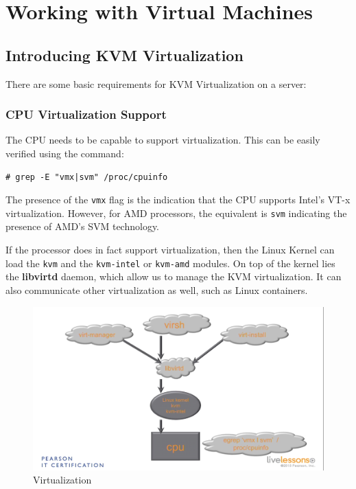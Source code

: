 \chapter{Working with Virtual Machines}

	\section{Introducing KVM Virtualization}
There are some basic requirements for KVM Virtualization on a server: 

\subsection{CPU Virtualization Support}
The CPU needs to be capable to support virtualization. This can be easily verified using the command:

\vspace{-15pt}
\begin{verbatim}
# grep -E "vmx|svm" /proc/cpuinfo
\end{verbatim}
\vspace{-10pt}

\noindent
The presence of the \verb|vmx| flag is the indication that the CPU supports Intel's VT-x virtualization. However, for AMD processors, the equivalent is \verb|svm| indicating the presence of AMD's SVM technology. 

If the processor does in fact support virtualization, then the Linux Kernel can load the \verb|kvm| and the \verb|kvm-intel| or \verb|kvm-amd| modules. On top of the kernel lies the \textbf{libvirtd} daemon, which allow us to manage the KVM virtualization. It can also communicate other virtualization as well, such as Linux containers. 

\begin{figure}[H]
	\centering
	\includegraphics[width=0.9\linewidth]{RHCSA/Mod2/chapters/2.12.a}
	\caption{Virtualization}
	\label{fig:2 Virtualization}
\end{figure}


